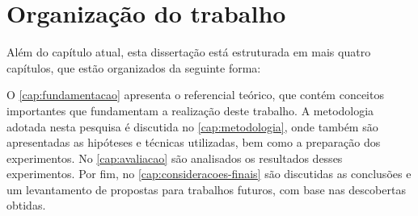 \section{Organização do trabalho}
\label{sec:introducao-organizacao-trabalho}

Além do capítulo atual, esta dissertação está estruturada em mais quatro capítulos, que estão organizados da seguinte forma:

O \autoref{cap:fundamentacao} apresenta o referencial teórico, que contém conceitos importantes que fundamentam a realização deste trabalho.
A metodologia adotada nesta pesquisa é discutida no \autoref{cap:metodologia}, onde também são apresentadas as hipóteses e técnicas utilizadas, bem como a preparação dos experimentos.
No \autoref{cap:avaliacao} são analisados os resultados desses experimentos.
Por fim, no \autoref{cap:consideracoes-finais} são discutidas as conclusões e um levantamento de propostas para trabalhos futuros, com base nas descobertas obtidas.
